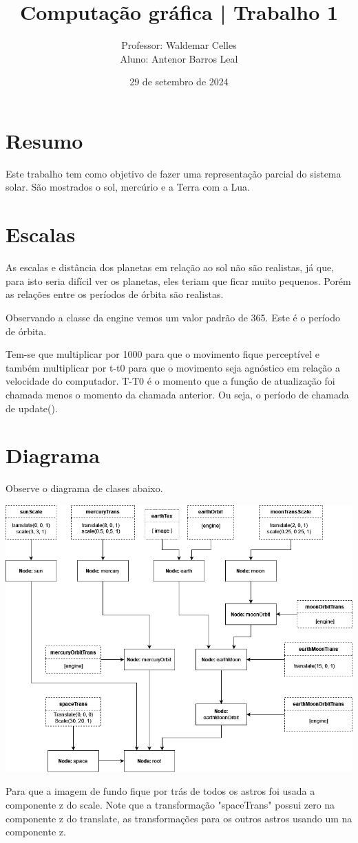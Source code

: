 \documentclass[11pt, a4paper]{article}
\title{Computação gráfica | Trabalho 1}
\author{Professor: Waldemar Celles\\
Aluno: Antenor Barros Leal}
\date{29 de setembro de 2024}
\begin{document}
\maketitle

\section {Resumo}
Este trabalho tem como objetivo de fazer uma representação parcial do sistema solar.
São mostrados o sol, mercúrio e a Terra com a Lua.

\section {Escalas}

As escalas e distância dos planetas em relação ao sol não são realistas, já que, para
isto seria difícil ver os planetas, eles teriam que ficar muito pequenos. Porém as
relações entre os períodos de órbita são realistas.

Observando a classe da engine vemos um valor padrão de 365. Este é o período de órbita.

Tem-se que multiplicar por 1000 para que o movimento fique perceptível e também multiplicar 
por t-t0 para que o movimento seja agnóstico em relação a velocidade do computador.
T-T0 é o momento que a função de atualização foi chamada menos o momento da chamada
anterior. Ou seja, o período de chamada de update().

\section{Diagrama}

Observe o diagrama de clases abaixo.

\includegraphics[width=0.8\linewidth]{Trab1Graph.png}

Para que a imagem de fundo fique por trás de todos os astros foi usada a componente z
do scale. Note que a transformação "spaceTrans" possui zero na componente z do translate,
as transformações para os outros astros usando um na componente z. 
\end{document}
